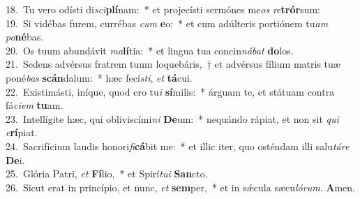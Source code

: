 {18.~}Tu vero odísti di\textit{sci}\textbf{plí}nam:~* et projecísti sermónes me\textit{os} \textit{re}\textbf{trór}sum:\\
{19.~}Si vidébas furem, currébas \textit{cum} \textbf{e}o:~* et cum adúlteris portiónem tu\textit{am} \textit{po}\textbf{né}bas.\\
{20.~}Os tuum abundávit \textit{ma}\textbf{lí}tia:~* et lingua tua concin\textit{ná}\textit{bat} \textbf{do}los.\\
{21.~}Sedens advérsus fratrem tuum loquebáris,~† et advérsus fílium matris tuæ poné\textit{bas} \textbf{scán}dalum:~* hæc fecí\textit{sti}, \textit{et} \textbf{tá}cui.\\
{22.~}Existimásti, iníque, quod ero tu\textit{i} \textbf{sí}milis:~* árguam te, et státuam contra fá\textit{ci}\textit{em} \textbf{tu}am.\\
{23.~}Intellígite hæc, qui obliviscími\textit{ni} \textbf{De}um:~* nequándo rápiat, et non sit \textit{qui} \textit{e}\textbf{rí}piat.\\
{24.~}Sacrifícium laudis honori\textit{fi}\textbf{cá}bit me:~* et illic iter, quo osténdam illi salu\textit{tá}\textit{re} \textbf{De}i.\\
{25.~}Glória Patri, \textit{et} \textbf{Fí}lio,~* et Spirí\textit{tu}\textit{i} \textbf{San}cto.\\
{26.~}Sicut erat in princípio, et nunc, \textit{et} \textbf{sem}per,~* et in sǽcula sæcu\textit{ló}\textit{rum}. \textbf{A}men.\\
